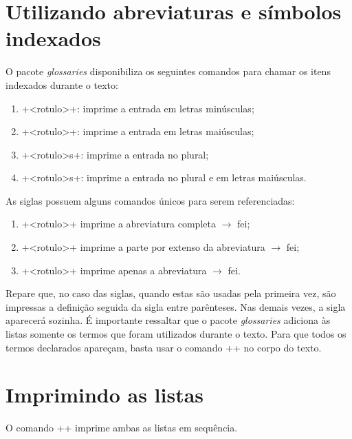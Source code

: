 \documentclass[xindy,rascunho]{fei}
\begin{document}
\begin{teorema}
	\section{Utilizando abreviaturas e símbolos indexados}
	
	O pacote \emph{glossaries} disponibiliza os seguintes comandos para chamar os itens indexados durante o texto:
	
	\begin{enumerate}
	\item \latexinline+\gls{<rotulo>}+: imprime a entrada em letras minúsculas;
	\item \latexinline+\Gls{<rotulo>}+: imprime a entrada em letras maiúsculas;
	\item \latexinline+\glspl{<rotulo>}+: imprime a entrada no plural;
	\item \latexinline+\Glspl{<rotulo>}+: imprime a entrada no plural e em letras maiúsculas.
	\end{enumerate}
	
	As siglas possuem alguns comandos únicos para serem referenciadas:
	
	\begin{enumerate}
	\item \latexinline+\acrfull{<rotulo>}+ imprime a abreviatura completa \(\to\) \acrfull{fei};
	\item \latexinline+\acrlong{<rotulo>}+ imprime a parte por extenso da abreviatura \(\to\) \acrlong{fei};
	\item \latexinline+\acrshort{<rotulo>}+ imprime apenas a abreviatura \(\to\) \acrshort{fei}.
	\end{enumerate}
	
	Repare que, no caso das siglas, quando estas são usadas pela primeira vez, são impressas a definição seguida da sigla entre parênteses. Nas demais vezes, a sigla aparecerá sozinha. É importante ressaltar que o pacote \emph{glossaries} adiciona às listas somente os termos que foram utilizados durante o texto. Para que todos os termos declarados apareçam, basta usar o comando \latexinline+\glsaddall+ no corpo do texto.
	
	\section{Imprimindo as listas}
	
	O comando \latexinline+\printglossaries+ imprime ambas as listas em sequência.


\end{teorema}
\end{document}
